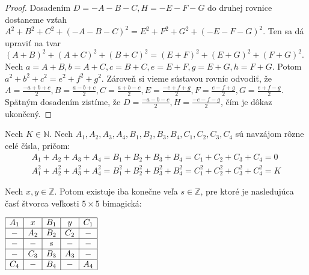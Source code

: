 \begin{proof} Dosadením $D = -A-B-C, H = -E-F-G$ do druhej rovnice dostaneme vzťah $A^2 + B^2 + C^2 + (-A-B-C)^2 = E^2 + F^2 + G^2 + (-E-F-G)^2$. Ten sa dá upraviť na tvar $(A+B)^2 + (A+C)^2 + (B+C)^2 = (E+F)^2 + (E+G)^2 + (F+G)^2$. Nech $a = A+B, b = A+C, c = B+C, e = E+F, g = E+G, h = F+G$. Potom $a^2 + b^2 + c^2 = e^2 + f^2 + g^2$. Zároveň si vieme sústavou rovníc odvodiť, že $A = \frac{-a+b+c}{2}, B = \frac{a-b+c}{2}, C = \frac{a+b-c}{2}, E = \frac{-e+f+g}{2}, F = \frac{e-f+g}{2}, G = \frac{e+f-g}{2}$. Spätným dosadením zistíme, že $D = \frac{-a-b-c}{2}, H = \frac{-e-f-g}{2}$, čím je dôkaz ukončený.
\end{proof}

\begin{theorem}
\label{5x5bimagic3}
Nech $K \in \mathbb{N}$. Nech $A_1, A_2, A_3, A_4, B_1, B_2, B_3, B_4, C_1, C_2, C_3, C_4$ sú navzájom rôzne celé čísla, pričom:
\begin{gather*}
A_1 + A_2 + A_3 + A_4 = B_1 + B_2 + B_3 + B_4 = C_1 + C_2 + C_3 + C_4 = 0 \\
A_1^2 + A_2^2 + A_3^2 + A_4^2 = B_1^2 + B_2^2 + B_3^2 + B_4^2 = C_1^2 + C_2^2 + C_3^2 + C_4^2 = K
\end{gather*}

Nech $x,y \in \mathbb{Z}$. Potom existuje iba konečne veľa $s \in \mathbb{Z}$, pre ktoré je nasledujúca časť štvorca veľkosti $5 \times 5$ bimagická: 

\begin{center}
$\begin{array}{ |c|c|c|c|c| }
\hline
A_1 & x & B_1 & y & C_1 \\ 
\hline
- & A_2 & B_2 & C_2 & -  \\ 
\hline
- & - & s & - & - \\ 
\hline
- & C_3 & B_3 & A_3 & - \\ 
\hline
C_4 & - & B_4 & - & A_4 \\ 
\hline
\end{array}$
\end{center}

\end{theorem}

